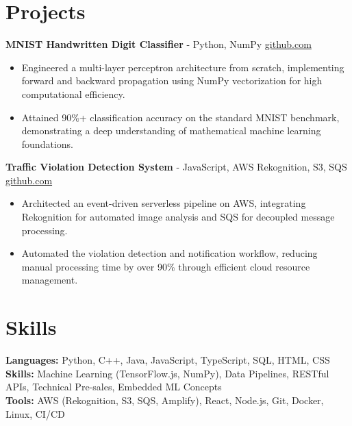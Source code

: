 \documentclass[11pt]{article}       %
\begin{document}
\vspace{-18.5pt}

\section*{Projects}

\textbf{MNIST Handwritten Digit Classifier}{ - Python, NumPy} \hfill \href{https://github.com/Monica20030707/Artificial-Neutral-Network_ML}{github.com} \\
\vspace{-9pt}
\begin{itemize} 
  \item Engineered a multi-layer perceptron architecture from scratch, implementing forward and backward propagation using NumPy vectorization for high computational efficiency. 
  \item Attained 90\%+ classification accuracy on the standard MNIST benchmark, demonstrating a deep understanding of mathematical machine learning foundations.
\end{itemize}

\textbf{Traffic Violation Detection System}{ - JavaScript, AWS Rekognition, S3, SQS} \hfill \href{https://github.com/Monica20030707/AWS_rekonigition-N-read-database}{github.com} \\
\vspace{-9pt}
\begin{itemize}
  \item Architected an event-driven serverless pipeline on AWS, integrating Rekognition for automated image analysis and SQS for decoupled message processing.
  \item Automated the violation detection and notification workflow, reducing manual processing time by over 90\% through efficient cloud resource management.
\end{itemize}

\vspace{-18.5pt}

\section*{Skills}
\textbf{Languages:} Python, C++, Java, JavaScript, TypeScript, SQL, HTML, CSS\\
\textbf{Skills:} Machine Learning (TensorFlow.js, NumPy), Data Pipelines, RESTful APIs, Technical Pre-sales, Embedded ML Concepts\\
\textbf{Tools:} AWS (Rekognition, S3, SQS, Amplify), React, Node.js, Git, Docker, Linux, CI/CD\\

\vspace{-6.5pt}
\end{document}
